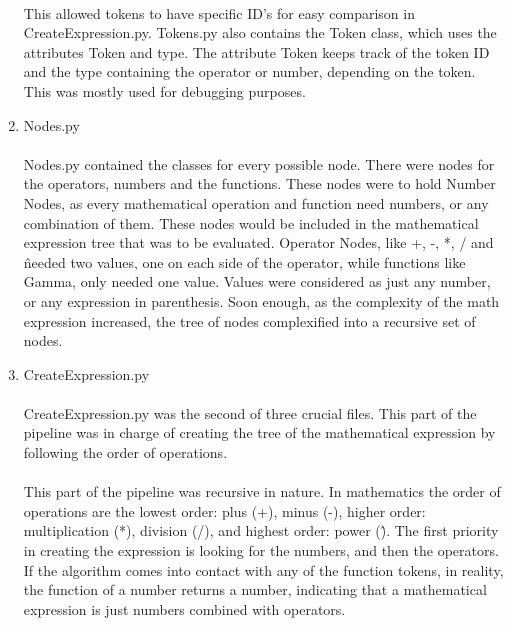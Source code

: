 \begin{enumerate}
            \paragraph{}
            This allowed tokens to have specific ID’s for easy comparison in CreateExpression.py. Tokens.py also contains the Token class, which uses the attributes Token and type. The attribute Token keeps track of the token ID and the type containing the operator or number, depending on the token. This was mostly used for debugging purposes.


            \item Nodes.py
            \paragraph{}
            Nodes.py contained the classes for every possible node. There were nodes for the operators, numbers and the functions. These nodes were to hold Number Nodes, as every mathematical operation and function need numbers, or any combination of them. These nodes would be included in the mathematical expression tree that was to be evaluated. Operator Nodes, like +, -, *, / and \^ needed two values, one on each side of the operator, while functions like Gamma, only needed one value. Values were considered as just any number, or any expression in parenthesis. Soon enough, as the complexity of the math expression increased, the tree of nodes complexified into a recursive set of nodes.

            \item CreateExpression.py
            \paragraph{}
            CreateExpression.py was the second of three crucial files. This part of the pipeline was in charge of creating the tree of the mathematical expression by following the order of operations.

            \paragraph{}
            This part of the pipeline was recursive in nature. In mathematics the order of operations are the lowest order:  plus (+), minus (-), higher order: multiplication (*), division (/), and highest order: power (\^). The first priority in creating the expression is looking for the numbers, and then the operators. If the algorithm comes into contact with any of the function tokens, in reality, the function of a number returns a number, indicating that a mathematical expression is just numbers combined with operators.


\end{enumerate}
